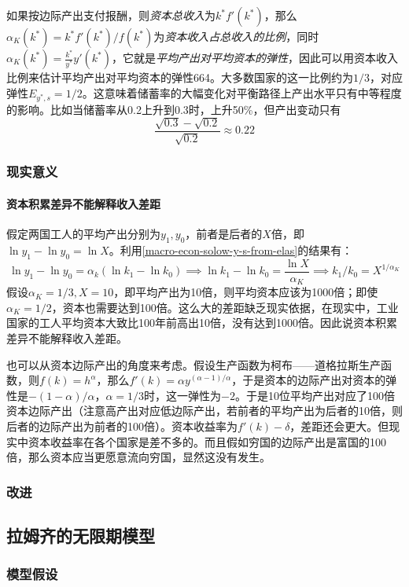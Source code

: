 如果按边际产出支付报酬，则\emph{资本总收入}为$k^*f'(k^*)$，那么$\alpha_K(k^*)=k^*f'(k^*)/f(k^*)$为\emph{资本收入占总收入的比例}，同时$\alpha_K(k^*)=\frac{k^*}{y^*}y'(k^*)$，它就是\emph{平均产出对平均资本的弹性}，因此可以用资本收入比例来估计平均产出对平均资本的弹性664。大多数国家的这一比例约为$1/3$，对应弹性$E_{y^*,s}=1/2$。这意味着储蓄率的大幅变化对平衡路径上产出水平只有中等程度的影响。比如当储蓄率从0.2上升到0.3时，上升50\%，但产出变动只有
$$\frac{\sqrt{0.3}-\sqrt{0.2}}{\sqrt{0.2}}\approx 0.22$$


\subsubsection{现实意义}
\paragraph*{资本积累差异不能解释收入差距}假定两国工人的平均产出分别为$y_1,y_0$，前者是后者的$X$倍，即$\ln y_1-\ln y_0=\ln X$。利用\eqref{macro-econ-solow-y-s-from-elas}的结果有：
$$\ln y_1-\ln y_0=\alpha_k (\ln k_1-\ln k_0)\implies \ln k_1-\ln k_0=\frac{\ln X}{\alpha_K}\implies k_1/k_0=X^{1/\alpha_K}$$
假设$\alpha_K=1/3,X=10$，即平均产出为10倍，则平均资本应该为1000倍；即使$\alpha_K=1/2$，资本也需要达到100倍。这么大的差距缺乏现实依据，在现实中，工业国家的工人平均资本大致比100年前高出10倍，没有达到1000倍。因此说{\kaishu 资本积累差异不能解释收入差距}。

也可以从资本边际产出的角度来考虑。假设生产函数为柯布——道格拉斯生产函数，则$f(k)=h^{\alpha}$，那么$f'(k)=\alpha y^{(\alpha-1)/\alpha}$，于是资本的边际产出对资本的弹性是$-(1-\alpha)/\alpha$，$\alpha=1/3$时，这一弹性为$-2$。于是10位平均产出对应了100倍资本边际产出（注意高产出对应低边际产出，若前者的平均产出为后者的10倍，则后者的边际产出为前者的100倍）。资本收益率为$f'(k)-\delta$，差距还会更大。但现实中资本收益率在各个国家是差不多的。而且假如穷国的边际产出是富国的100倍，那么资本应当更愿意流向穷国，显然这没有发生。
\subsubsection{改进}

\subsection{拉姆齐的无限期模型}\label{macro-econ-ramsey}
\subsubsection{模型假设}
